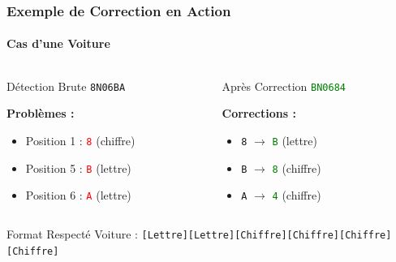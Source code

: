 \documentclass[
	11pt,
	aspectratio=169,
]{beamer}
\begin{document}
\begin{frame}
	\frametitle{Exemple de Correction en Action}
	\framesubtitle{Cas d'une Voiture}
	
	\begin{columns}[c]
		\begin{column}{0.48\textwidth}
			\begin{block}{Détection Brute}
				\Large
				\centering
				\texttt{8N06BA}
				
				\normalsize
				\bigskip
				
				\textbf{Problèmes :}
				\begin{itemize}
					\item Position 1 : \textcolor{red}{\texttt{8}} (chiffre)
					\item Position 5 : \textcolor{red}{\texttt{B}} (lettre)
					\item Position 6 : \textcolor{red}{\texttt{A}} (lettre)
				\end{itemize}
			\end{block}
		\end{column}
		
		\begin{column}{0.48\textwidth}
			\begin{exampleblock}{Après Correction}
				\Large
				\centering
				\textcolor{green}{\texttt{BN0684}}
				
				\normalsize
				\bigskip
				
				\textbf{Corrections :}
				\begin{itemize}
					\item \texttt{8} $\rightarrow$ \textcolor{green}{\texttt{B}} (lettre)
					\item \texttt{B} $\rightarrow$ \textcolor{green}{\texttt{8}} (chiffre)
					\item \texttt{A} $\rightarrow$ \textcolor{green}{\texttt{4}} (chiffre)
				\end{itemize}
			\end{exampleblock}
		\end{column}
	\end{columns}
	
	\smallskip
	
	\begin{block}{Format Respecté}
		\centering
		Voiture : \texttt{[Lettre][Lettre][Chiffre][Chiffre][Chiffre][Chiffre]}
	\end{block}
\end{frame}

\end{document}
